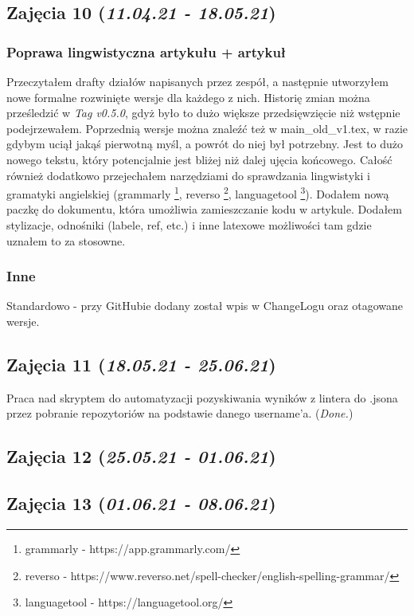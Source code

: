 \documentclass[graybox]{svmult}
\begin{document}
\subsection{Zajęcia 10 (\emph{11.04.21 - 18.05.21})}

\subsubsection{Poprawa lingwistyczna artykułu + artykuł}

Przeczytałem drafty działów napisanych przez zespół, a następnie utworzyłem nowe formalne rozwinięte wersje dla każdego z nich. Historię zmian można prześledzić w  \emph{Tag v0.5.0}, gdyż było to dużo większe przedsięwzięcie niż wstępnie podejrzewałem. Poprzednią wersje można znaleźć też w main\_old\_v1.tex, w razie gdybym uciął jakąś pierwotną myśl, a powrót do niej był potrzebny. Jest to dużo nowego tekstu, który potencjalnie jest bliżej niż dalej ujęcia końcowego. Całość również dodatkowo przejechałem narzędziami do sprawdzania lingwistyki i gramatyki angielskiej (grammarly \footnote{grammarly - https://app.grammarly.com/}, reverso \footnote{reverso - https://www.reverso.net/spell-checker/english-spelling-grammar/}, languagetool \footnote{languagetool - https://languagetool.org/}). Dodałem nową paczkę do dokumentu, która umożliwia zamieszczanie kodu w artykule. Dodałem stylizacje, odnośniki (labele, ref, etc.) i inne latexowe możliwości tam gdzie uznałem to za stosowne.

\subsubsection{Inne}

Standardowo - przy GitHubie dodany został wpis w ChangeLogu oraz otagowane wersje.

\subsection{Zajęcia 11 (\emph{18.05.21 - 25.06.21})}

Praca nad skryptem do automatyzacji pozyskiwania wyników z lintera do .jsona przez pobranie repozytoriów na podstawie danego username'a. (\textit{Done.})

\subsection{Zajęcia 12 (\emph{25.05.21 - 01.06.21})}

\subsection{Zajęcia 13 (\emph{01.06.21 - 08.06.21})}
\end{document}
